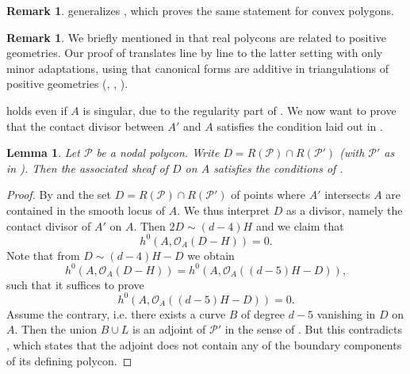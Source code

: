 \documentclass[a4paper,10pt]{amsart}
\theoremstyle{definition}
\newtheorem{rem}[defin]{Remark}
\theoremstyle{plain}
\newtheorem{lem}[defin]{Lemma}
\newcommand{\cO}{{\mathcal O}}
\newcommand{\cP}{{\mathcal P}}
\begin{document}
\begin{rem}
  generalizes \cite[Proposition 5.4]{BrueserKummerPavlov2025Adjoints}, which proves the same statement for convex polygons.
\end{rem}

\begin{rem}
 We briefly mentioned in  that real polycons are related to positive geometries. Our proof of  translates line by line to the latter setting with only minor adaptations, using that canonical forms are additive in triangulations of positive geometries (\cite[\S3]{arkani2017PosGeom}, \cite[Theorem 11]{Lam2022PosGeom}, \cite[Proposition 2.18]{KohnEtAl2024AdjCurves}).
\end{rem}

 holds even if $A$ is singular, due to the regularity part of . We now want to prove that the contact divisor between $A'$ and $A$ satisfies the condition laid out in .

\begin{lem}
 Let $\cP$ be a nodal polycon. Write $D = R(\cP) \cap R(\cP')$ (with $\cP'$ as in ). Then the associated sheaf of $D$ on $A$ satisfies the conditions of .
\end{lem}

\begin{proof}
 By  and  the set $D = R(\cP) \cap R(\cP')$ of points where $A'$ intersects $A$ are contained in the smooth locus of $A$. We thus interpret $D$ as a divisor, namely the contact divisor of $A'$ on $A$. Then $2D \sim (d-4)H$ and we claim that
 \begin{equation*}
     h^0(A, \cO_A(D-H)) = 0.
 \end{equation*}
 Note that from $D \sim (d-4)H - D$ we obtain
 \begin{equation*}
     h^0(A, \cO_A(D-H)) = h^0(A, \cO_A((d-5)H-D)),
 \end{equation*}
 such that it suffices to prove
 \begin{equation*}
     h^0(A, \cO_A((d-5)H - D)) = 0.
 \end{equation*}
 Assume the contrary, i.e. there exists a curve $B$ of degree $d-5$ vanishing in $D$ on $A$. Then the union $B \cup L$ is an adjoint of $\cP'$ in the sense of . But this contradicts , which states that the adjoint does not contain any of the boundary components of its defining polycon.
\end{proof}
\end{document}
